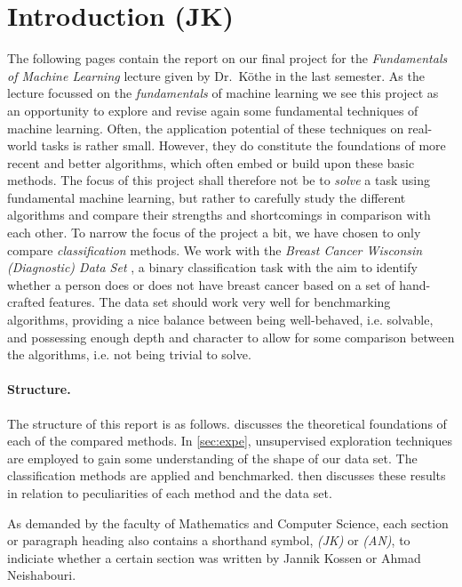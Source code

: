 \documentclass[11pt, a4paper]{scrartcl}
\begin{document}
\tableofcontents
\pagebreak


\section{Introduction (JK)}
The following pages contain the report on our final project for the \emph{Fundamentals of Machine Learning} lecture given by Dr.\ Köthe in the last semester. As the lecture focussed on the \emph{fundamentals} of machine learning we see this project as an opportunity to explore and revise again some fundamental techniques of machine learning. Often, the application potential of these techniques on real-world tasks is rather small. However, they do constitute the foundations of more recent and better algorithms, which often embed or build upon these basic methods. 
The focus of this project shall therefore not be to \emph{solve} a task using fundamental machine learning, but rather to carefully study the different algorithms and compare their strengths and shortcomings in comparison with each other. To narrow the focus of the project a bit, we have chosen to only compare \emph{classification} methods.
We work with the \emph{Breast Cancer Wisconsin (Diagnostic) Data Set} \cite{street1993nuclear}, a binary classification task with the aim to identify whether a person does or does not have breast cancer based on a set of hand-crafted features. The data set should work very well for benchmarking algorithms, providing a nice balance between being well-behaved, i.e. solvable, and possessing enough depth and character to allow for some comparison between the algorithms, i.e. not being trivial to solve.

\paragraph{Structure.} The structure of this report is as follows.  discusses the theoretical foundations of each of the compared methods. In \cref{sec:expe}, unsupervised exploration techniques are employed to gain some understanding of the shape of our data set. The classification methods are applied and benchmarked.  then discusses these results in relation to peculiarities of each method and the data set.

As demanded by the faculty of Mathematics and Computer Science, each section or paragraph heading also contains a shorthand symbol, \emph{(JK)} or \emph{(AN)}, to indiciate whether a certain section was written by Jannik Kossen or Ahmad Neishabouri.
\end{document}

